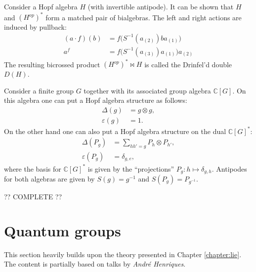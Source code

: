     \begin{construct}
        Consider a Hopf algebra $H$ (with invertible antipode). It can be shown that $H$ and $(H^{op})^*$ form a matched pair of bialgebras. The left and right actions are induced by pullback:
        \begin{align}
            (a\cdot f)(b) &= f\big(S^{-1}(a_{(2)})ba_{(1)}\big)\\
            a^f &= f\big(S^{-1}(a_{(3)})a_{(1)}\big)a_{(2)}
        \end{align}
        The resulting bicrossed product $(H^{op})^*\bowtie H$ is called the Drinfel'd double $D(H)$.
    \end{construct}
    \begin{example}
        Consider a finite group $G$ together with its associated group algebra $\mathbb{C}[G]$. On this algebra one can put a Hopf algebra structure as follows:
        \begin{align}
            \Delta(g) &= g\otimes g,\\
            \varepsilon(g) &= 1.
        \end{align}
        On the other hand one can also put a Hopf algebra structure on the dual $\mathbb{C}[G]^*$:
        \begin{align}
            \Delta(P_g) &= \sum_{hh'=g}P_h\otimes P_{h'},\\
            \varepsilon(P_g) &= \delta_{g,e},
        \end{align}
        where the basis for $\mathbb{C}[G]^*$ is given by the ``projections'' $P_g:h\mapsto\delta_{g,h}$. Antipodes for both algebras are given by $S(g)=g^{-1}$ and $S(P_g) = P_{g^{-1}}$.

        ?? COMPLETE ??
    \end{example}

\section{Quantum groups}

    This section heavily builds upon the theory presented in Chapter \ref{chapter:lie}. The content is partially based on talks by \textit{Andr\'e Henriques}.

